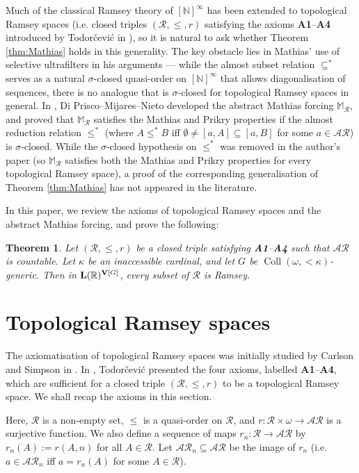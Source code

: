 \documentclass[10pt,a4paper]{amsart}
\theoremstyle{plain}
\numberwithin{equation}{section}
\newtheorem{theorem}{Theorem}[section]
\theoremstyle{definition}
\newcommand{\func}{\operatorname}
\newcommand{\R}{\mathbb{R}}
\newcommand{\N}{\mathbb{N}}
\newcommand{\cal}{\mathcal}
\renewcommand{\bf}{\mathbf}
\newcommand{\Coll}{\func{Coll}}
\newcommand{\V}{\bf{V}}
\DeclareRobustCommand{\L}{\ifmmode\mathbf{L}\else\strokeL\fi}
\begin{document}
Much of the classical Ramsey theory of $[\N]^\infty$ has been extended to topological Ramsey spaces (i.e. closed triples $(\cal{R},\leq,r)$ satisfying the axioms \textbf{A1}--\textbf{A4} introduced by Todor\v{c}evi\'{c} in \cite{T10}), so it is natural to ask whether Theorem \ref{thm:Mathias} holds in this generality. The key obstacle lies in Mathias' use of selective ultrafilters in his arguments --- while the almost subset relation $\subseteq^*$ serves as a natural $\sigma$-closed quasi-order on $[\N]^\infty$ that allows diagonalisation of sequences, there is no analogue that is $\sigma$-closed for topological Ramsey spaces in general. In \cite{DMN15}, Di Prisco--Mijares--Nieto developed the abstract Mathias forcing $\mathbb{M}_\cal{R}$, and proved that $\mathbb{M}_\cal{R}$ satisfies the Mathias and Prikry properties if the almost reduction relation $\leq^*$ (where $A \leq^*B$ iff $\emptyset \neq [a,A] \subseteq [a,B]$ for some $a \in \cal{AR}$) is $\sigma$-closed. While the $\sigma$-closed hypothesis on $\leq^*$ was removed in the author's paper \cite{Y25} (so $\mathbb{M}_\cal{R}$ satisfies both the Mathias and Prikry properties for every topological Ramsey space), a proof of the corresponding generalisation of Theorem \ref{thm:Mathias} has not appeared in the literature.

In this paper, we review the axioms of topological Ramsey spaces and the abstract Mathias forcing, and prove the following:


\begin{theorem}
\label{thm:main}
    Let $(\cal{R},\leq,r)$ be a closed triple satisfying \textbf{A1}--\textbf{A4} such that $\cal{AR}$ is countable. Let $\kappa$ be an inaccessible cardinal, and let $G$ be $\Coll(\omega,{<}\kappa)$-generic. Then in $\L(\R)^{\V[G]}$, every subset of $\cal{R}$ is Ramsey.
\end{theorem}


\section{Topological Ramsey spaces}
\label{sec:TRS}
The axiomatisation of topological Ramsey spaces was initially studied by Carlson and Simpson in \cite{CS90}. In \cite{T10}, Todor\v{c}evi\'{c} presented the four axioms, labelled \textbf{A1}--\textbf{A4}, which are sufficient for a closed triple $(\cal{R},\leq,r)$ to be a topological Ramsey space. We shall recap the axioms in this section.

Here, $\cal{R}$ is a non-empty set, $\leq$ is a quasi-order on $\cal{R}$, and $r : \cal{R} \times \omega \to \cal{AR}$ is a surjective function. We also define a sequence of maps $r_n : \cal{R} \to \cal{AR}$ by $r_n(A) := r(A,n)$ for all $A \in \cal{R}$. Let $\cal{AR}_n \subseteq \cal{AR}$ be the image of $r_n$ (i.e. $a \in \cal{AR}_n$ iff $a = r_n(A)$ for some $A \in \cal{R}$).
\end{document}
